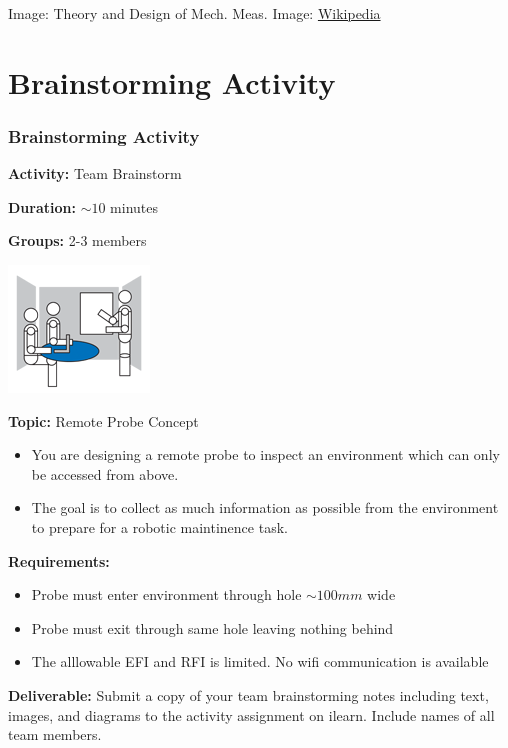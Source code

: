 \documentclass[fleqn]{beamer} %
\newcommand{\sectiontitleIV}{Brainstorming Activity}
\begin{document}
\begin{frame}
{\tiny Image: Theory and Design of Mech. Meas. \hspace{20mm} Image: \href{https://en.wikipedia.org/wiki/Thermocouple}{Wikipedia} }
\end{frame}

\section{\sectiontitleIV}

	\begin{frame}[label=sectionIV]
	\frametitle{\sectiontitleIV}

		
		\begin{multicols}{2}
			\tiny
			{\bf Activity:} Team Brainstorm

			{\bf Duration:} $\sim 10$ minutes

			{\bf Groups:} 2-3 members

			\includegraphics[scale=0.5]{Brainstorm_room.png}

			{\bf Topic:} Remote Probe Concept
			\begin{itemize}
				\item You are designing a remote probe to inspect an environment which can only be accessed from above. 
				\item The goal is to collect as much information as possible from the environment to prepare for a robotic maintinence task. 
	        \end{itemize}

	    \end{multicols}	

	    {\bf Requirements:}	
		\begin{itemize}
			\item Probe must enter environment through hole $\sim 100mm$ wide 
			\item Probe must exit through same hole leaving nothing behind
			\item The alllowable EFI and RFI is limited. No wifi communication is available \vspace{4mm}
		\end{itemize}

		{\bf Deliverable:} Submit a copy of your team brainstorming notes including text, images, and diagrams to the activity assignment on ilearn. Include names of all team members.

	\end{frame}
\end{document}
